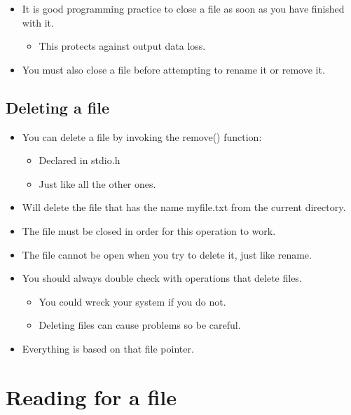 \begin{itemize}
    \item It is good programming practice to close a file as soon as you have finished with it.
        \begin{itemize}
            \item This protects against output data loss.
        \end{itemize}
    
    \item You must also close a file before attempting to rename it or remove it.
\end{itemize}

\subsection{Deleting a file}
\begin{itemize}
    \item You can delete a file by invoking the remove() function:
        \begin{itemize}
            \item Declared in stdio.h
            \item Just like all the other ones.
        \end{itemize}
    
    \item Will delete the file that has the name myfile.txt from the current directory.
    \item The file must be closed in order for this operation to work.
    \item The file cannot be open when you try to delete it, just like rename. 
    \item You should always double check with operations that delete files.
        \begin{itemize}
            \item You could wreck your system if you do not.
            \item Deleting files can cause problems so be careful.
        \end{itemize}
    
    \item Everything is based on that file pointer.
\end{itemize}


\section{Reading for a file}
